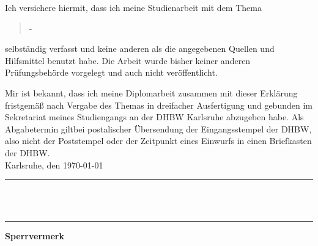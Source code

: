 Ich versichere hiermit, dass ich meine Studienarbeit mit dem Thema
\begin{quote}
\textit{\titel} -\textit{ \untertitel }
\end{quote}
selbständig verfasst und keine anderen als die angegebenen Quellen und Hilfsmittel benutzt habe. Die Arbeit wurde bisher keiner anderen Prüfungsbehörde vorgelegt und auch nicht veröffentlicht.


Mir ist bekannt, dass ich meine Diplomarbeit zusammen mit dieser Erklärung fristgemäß nach Vergabe des Themas in dreifacher Ausfertigung und gebunden im Sekretariat meines Studiengangs an der DHBW Karlsruhe abzugeben habe. Als Abgabetermin giltbei postalischer Übersendung der Eingangsstempel der DHBW, also nicht der Poststempel oder der Zeitpunkt eines
Einwurfs in einen Briefkasten der DHBW.\\[10ex]

Karlsruhe, den \today \\[4ex]


\rule[-0.2cm]{5cm}{0.5pt} \\

\textsc{\autor} \\[10ex]

\hrule 
\vspace*{1.0cm}
\noindent \textbf{\Large{Sperrvermerk}}\\
\normalsize